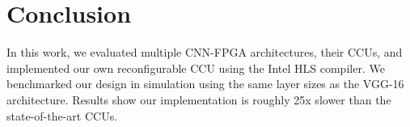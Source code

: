 \chapter{Conclusion}
In this work, we evaluated multiple CNN-FPGA architectures, their CCUs, and implemented our own reconfigurable CCU using the Intel HLS compiler. We benchmarked our design in simulation using the same layer sizes as the VGG-16 architecture. Results show our implementation is roughly 25x slower than the state-of-the-art CCUs.